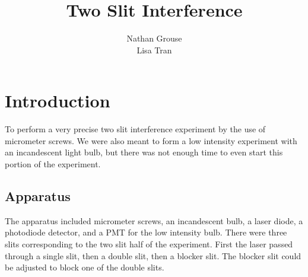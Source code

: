 \documentclass[12pt]{article}
\title{Two Slit Interference}
\author{Nathan Grouse\\Lisa Tran}
\begin{document}
\maketitle

\section{Introduction}
\indent \indent To perform a very precise two slit interference experiment by the use of micrometer screws. We were also meant to form a low intensity experiment with an incandescent light bulb, but there was not enough time to even start this portion of the experiment.

\subsection{Apparatus}
\indent \indent The apparatus included micrometer screws, an incandescent bulb, a laser diode, a photodiode detector, and a PMT for the low intensity bulb. There were three slits corresponding to the two slit half of the experiment. First the laser passed through a single slit, then a double slit, then a blocker slit. The blocker slit could be adjusted to block one of the double slits.
\end{document}
